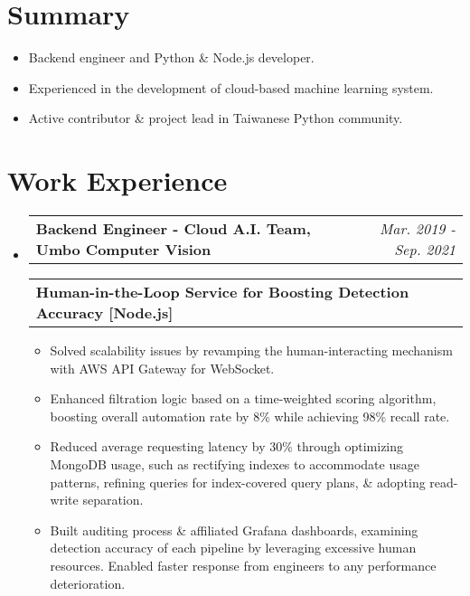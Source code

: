 \documentclass[letterpaper,11pt]{article}
\makeatletter
\newcommand{\resumeItem}[1]{
  \item\small{
    {#1 \vspace{-2pt}}
  }
}
\newcommand{\resumeSubheading}[2]{
  \vspace{-2pt}\item
    \begin{tabular*}{0.97\textwidth}[t]{l@{\extracolsep{\fill}}r}
      \textbf{#1} & \textit{\small #2} \\
    \end{tabular*}\vspace{-5pt}
}
\newcommand{\resumeSubSubheading}[1]{
    \begin{tabular*}{0.97\textwidth}{l@{\extracolsep{\fill}}r}
      \textbf{\small#1} \\
    \end{tabular*}\vspace{-5pt} 
}
\newcommand{\resumeSubHeadingListStart}{\begin{itemize}[leftmargin=*, label={}]}
\newcommand{\resumeItemListStart}{\begin{itemize}}
\newcommand{\resumeItemListEnd}{\end{itemize}\vspace{-5pt}}
\makeatother
\begin{document}
\section{Summary}
  \begin{itemize}[leftmargin=16px]
    \item\small{{Backend engineer and Python \& Node.js developer.  \vspace{-8pt}}}
    \item\small{{Experienced in the development of cloud-based machine learning system.  \vspace{-8pt}}}
    \item\small{{Active contributor \& project lead in Taiwanese Python community.   \vspace{-8pt}}}
  \resumeItemListEnd

\vspace{8pt}
\section{Work Experience}
  \resumeSubHeadingListStart
    \resumeSubheading
      {Backend Engineer - Cloud A.I. Team, Umbo Computer Vision}{Mar. 2019 - Sep. 2021}
      
      \vspace{4px}
      \resumeSubSubheading
        {\hspace{4px}Human-in-the-Loop Service for Boosting Detection Accuracy [Node.js]}
        \resumeItemListStart
          \resumeItem{Solved scalability issues by revamping the human-interacting mechanism with AWS API Gateway for WebSocket.}
          \resumeItem{Enhanced filtration logic based on a time-weighted scoring algorithm, boosting overall automation rate by 8\% while achieving 98\% recall rate.}
          \resumeItem{Reduced average requesting latency by 30\% through optimizing MongoDB usage, such as rectifying indexes to accommodate usage patterns, refining queries for index-covered query plans, \& adopting read-write separation.}
          \resumeItem{Built auditing process \& affiliated Grafana dashboards, examining detection accuracy of each pipeline by leveraging excessive human resources. Enabled faster response from engineers to any performance deterioration.}
        \resumeItemListEnd


\end{itemize}
\end{document}
